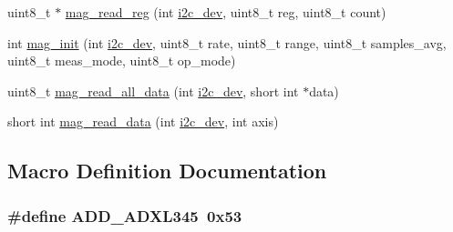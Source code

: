 \begin{DoxyCompactItemize}
uint8\-\_\-t $\ast$ \hyperlink{imu__functions_01_07C_xC3_xB3pia_01em_01conflito_01de_01Andr_xC3_xA9_01Carvalho_012013-04-26_08_8h_a6830eaeae2298320e1e8c902e4edd709}{mag\-\_\-read\-\_\-reg} (int \hyperlink{CommunicationV0_2communication_8c_a7751bd45ac1064efb35adf1f19c25db8}{i2c\-\_\-dev}, uint8\-\_\-t reg, uint8\-\_\-t count)
\item 
int \hyperlink{imu__functions_01_07C_xC3_xB3pia_01em_01conflito_01de_01Andr_xC3_xA9_01Carvalho_012013-04-26_08_8h_a014f908c9faa37c1ec75177a17012a01}{mag\-\_\-init} (int \hyperlink{CommunicationV0_2communication_8c_a7751bd45ac1064efb35adf1f19c25db8}{i2c\-\_\-dev}, uint8\-\_\-t rate, uint8\-\_\-t range, uint8\-\_\-t samples\-\_\-avg, uint8\-\_\-t meas\-\_\-mode, uint8\-\_\-t op\-\_\-mode)
\item 
uint8\-\_\-t \hyperlink{imu__functions_01_07C_xC3_xB3pia_01em_01conflito_01de_01Andr_xC3_xA9_01Carvalho_012013-04-26_08_8h_a8f2fd896caf1216ba82e535e6251692f}{mag\-\_\-read\-\_\-all\-\_\-data} (int \hyperlink{CommunicationV0_2communication_8c_a7751bd45ac1064efb35adf1f19c25db8}{i2c\-\_\-dev}, short int $\ast$data)
\item 
short int \hyperlink{imu__functions_01_07C_xC3_xB3pia_01em_01conflito_01de_01Andr_xC3_xA9_01Carvalho_012013-04-26_08_8h_a542a31ccd07cd2c3e8e2b68cdb6d219e}{mag\-\_\-read\-\_\-data} (int \hyperlink{CommunicationV0_2communication_8c_a7751bd45ac1064efb35adf1f19c25db8}{i2c\-\_\-dev}, int axis)
\end{DoxyCompactItemize}


\subsection{Macro Definition Documentation}
\hypertarget{imu__functions_01_07C_xC3_xB3pia_01em_01conflito_01de_01Andr_xC3_xA9_01Carvalho_012013-04-26_08_8h_a909f4a5773e20e672cdb4088e1cfa22f}{
\subsubsection[{A\-D\-D\-\_\-\-A\-D\-X\-L345}]{\setlength{\rightskip}{0pt plus 5cm}\#define A\-D\-D\-\_\-\-A\-D\-X\-L345~0x53}}\label{imu__functions_01_07C_xC3_xB3pia_01em_01conflito_01de_01Andr_xC3_xA9_01Carvalho_012013-04-26_08_8h_a909f4a5773e20e672cdb4088e1cfa22f}


